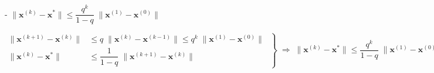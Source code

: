 \documentclass[12pt, UTF8, nofonts]{ctexart}
\begin{document}
- $\|\boldsymbol{x}^{(k)}-\boldsymbol{x}^{\ast}\|\leq\dfrac{q^k}{1-q}\;\|\boldsymbol{x}^{(1)}-\boldsymbol{x}^{(0)}\|$

\[
    \left.\begin{aligned}
        \|\boldsymbol{x}^{(k+1)}-\boldsymbol{x}^{(k)}\| &\leq q \;
        \|\boldsymbol{x}^{(k)}-\boldsymbol{x}^{(k-1)}\| \leq q^k \;
        \|\boldsymbol{x}^{(1)}-\boldsymbol{x}^{(0)}\| \\
        \|\boldsymbol{x}^{(k)}-\boldsymbol{x}^{\ast}\| &\leq
        \dfrac{1}{1-q} \; \|\boldsymbol{x}^{(k+1)}-\boldsymbol{x}^{(k)}\|
    \end{aligned} \;\right\} \;\Rightarrow\;
    \|\boldsymbol{x}^{(k)}-\boldsymbol{x}^{\ast}\| \leq \dfrac{q^k}{1-q} \;
    \|\boldsymbol{x}^{(1)}-\boldsymbol{x}^{(0)}\|
\]
\end{document}

